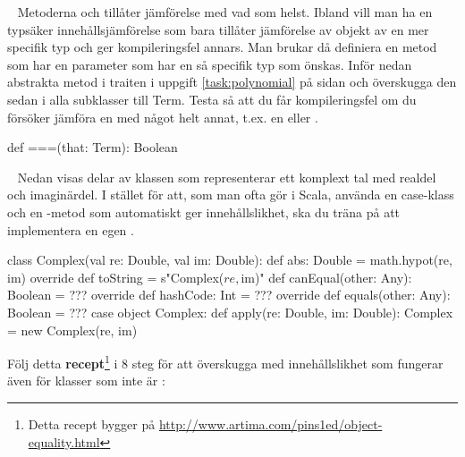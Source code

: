 










\QUESTBEGIN

\Task  \what~  Metoderna  och \code{==} tillåter jämförelse med vad som helst. Ibland vill man ha en typsäker innehållsjämförelse som bara tillåter jämförelse av objekt av en mer specifik typ och ger kompileringsfel annars. Man brukar då definiera en metod \code{===} som har en parameter  som har en så specifik typ som önskas. Inför nedan abstrakta metod \code{===} i traiten  i uppgift \ref{task:polynomial} på sidan \pageref{task:polynomial} och överskugga den sedan i alla subklasser till Term. Testa så att du får kompileringsfel om du försöker jämföra en  med något helt annat, t.ex. en  eller .
\begin{Code}
  def ===(that: Term): Boolean
\end{Code}


\SOLUTION


\TaskSolved \what



\QUESTEND







\QUESTBEGIN

\Task \label{task:equals:Complex} \what~   Nedan visas delar av klassen  som representerar ett komplext tal med realdel och imaginärdel. I stället för att, som man ofta gör i Scala, använda en case-klass och en -metod som automatiskt ger innehållslikhet, ska du träna på att implementera en egen .
\begin{Code}
class Complex(val re: Double, val im: Double):
  def abs: Double = math.hypot(re, im)
  override def toString = s"Complex($re, $im)"
  def canEqual(other: Any): Boolean = ???
  override def hashCode: Int  = ???
  override def equals(other: Any): Boolean = ???
case object Complex:
  def apply(re: Double, im: Double): Complex = new Complex(re, im)
\end{Code}
Följ detta \textbf{recept}\footnote{Detta recept bygger på \url{http://www.artima.com/pins1ed/object-equality.html}} i 8 steg för att överskugga  med innehållslikhet som fungerar även för klasser som inte är :

